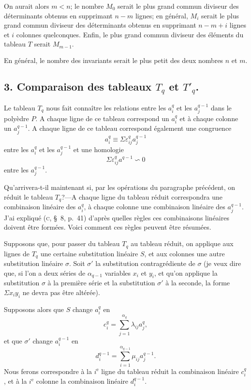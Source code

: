 \documentclass{article}
\begin{document}
On aurait alors $m<n$; le nombre $M_{0}$ serait le plus grand commun diviseur des déterminants obtenus en supprimant $n-m$ lignes; en général, $M_{i}$ serait le plus grand commun diviseur des déterminants obtenus en supprimant $n-m+i$ lignes et $i$ colonnes quelconques. Enfin, le plus grand commun diviseur des éléments du tableau $T$ serait $M_{m-1}$.

En général, le nombre des invariants serait le plus petit des deux nombres $n$ et $m$.

\subsection*{3. Comparaison des tableaux $T_{q}$ et $T'_{q}$.}

Le tableau $T_{q}$ nous fait connaître les relations entre les $a^{q}_{i}$ et les $a^{q-1}_{j}$ dans le polyèdre $P$. A chaque ligne de ce tableau correspond un $a^{q}_{i}$ et à chaque colonne un $a^{q-1}_{j}$. A chaque ligne de ce tableau correspond également une congruence
\[ a^{q}_{i} \equiv \Sigma \varepsilon^{q}_{ij} a^{q-1}_{j} \tag{1} \]
entre les $a^{q}_{i}$ et les $a^{q-1}_{j}$ et une homologie
\[ \Sigma \varepsilon^{q}_{ij} a^{q-1} \backsim 0 \tag{2} \]
entre les $a^{q-1}_{j}$.

Qu'arrivera-t-il maintenant si, par les opérations du paragraphe précédent, on réduit le tableau $T_{q}$?---A chaque ligne du tableau réduit correspondra une combinaison linéaire des $a^{q}_{i}$, à chaque colonne une combinaison linéaire des $a^{q-1}_{j}$. J'ai expliqué (\textsc{c}, \S~8, p.\ 41) d'après quelles règles ces combinaisons linéaires doivent être formées. Voici comment ces règles peuvent être résumées.

Supposons que, pour passer du tableau $T_{q}$ au tableau réduit, on applique aux lignes de $T_{q}$ une certaine substitution linéaire $S$, et aux colonnes une autre substitution linéaire $\sigma$. Soit $\sigma'$ la substitution contragrédiente de $\sigma$ (je veux dire que, si l'on a deux séries de $\alpha_{q-1}$ variables $x_{i}$ et $y_{i}$, et qu'on applique la substitution $\sigma$ à la première série et la substitution $\sigma'$ à la seconde, la forme $\Sigma x_{i} y_{i}$ ne devra pas être altérée).

Supposons alors que $S$ change $a^{q}_{i}$ en
\[ c^{q}_{i} = \sum_{j=1}^{\alpha_{q}} \lambda_{ij} a^{q}_{j}, \]
et que $\sigma'$ change $a^{q-1}_{i}$ en
\[ d^{q-1}_{i} = \sum_{i=1}^{\alpha_{q-1}} \mu_{ij} a^{q-1}_{j}. \]
Nous ferons correspondre à la $i^{\text{e}}$ ligne du tableau réduit la combinaison linéaire $c^{q}_{i}$, et à la $i^{\text{e}}$ colonne la combinaison linéaire $d^{q-1}_{i}$.
\end{document}
